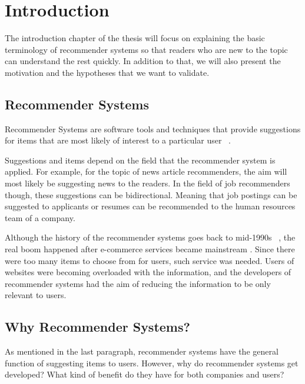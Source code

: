 \renewcommand\textbullet{\ensuremath{\bullet}}

\chapter{Introduction}\label{chapter:introduction}

The introduction chapter of the thesis will focus on explaining the basic terminology of recommender systems so that readers who are new to the topic can understand the rest quickly. In addition to that, we will also present the motivation and the hypotheses that we want to validate.

\section{Recommender Systems}

Recommender Systems are software tools and techniques that provide suggestions for items that are most likely of interest to a particular user ~\parencite{Ricci2015}. 

Suggestions and items depend on the field that the recommender system is applied. For example, for the topic of news article recommenders, the aim will most likely be suggesting news to the readers. In the field of job recommenders though, these suggestions can be bidirectional. Meaning that job postings can be suggested to applicants or resumes can be recommended to the human resources team of a company.

Although the history of the recommender systems goes back to mid-1990s ~\parencite{PARK201210059}, the real boom happened after e-commerce services became mainstream \cite{smith2017two}. Since there were too many items to choose from for users, such service was needed. Users of websites were becoming overloaded with the information, and the developers of recommender systems had the aim of reducing the information to be only relevant to users. 

\section{Why Recommender Systems?}

As mentioned in the last paragraph, recommender systems have the general function of suggesting items to users. However, why do recommender systems get developed? What kind of benefit do they have for both companies and users?

